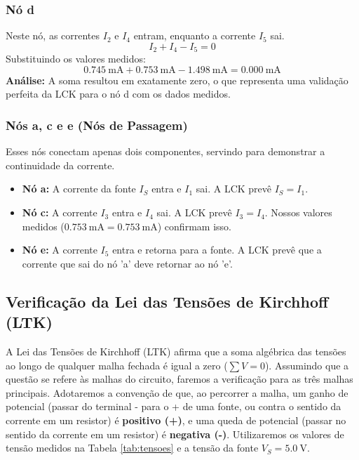 \documentclass[a4paper, 12pt]{article}
\begin{document}
\subsubsection{Nó d}
Neste nó, as correntes $I_2$ e $I_4$ entram, enquanto a corrente $I_5$ sai.
\begin{equation*}
I_2 + I_4 - I_5 = 0
\end{equation*}
Substituindo os valores medidos:
\begin{equation*}
\SI{0.745}{\milli\ampere} + \SI{0.753}{\milli\ampere} - \SI{1.498}{\milli\ampere} = \SI{0.000}{\milli\ampere}
\end{equation*}
\textbf{Análise:} A soma resultou em exatamente zero, o que representa uma validação perfeita da LCK para o nó d com os dados medidos.

\subsubsection{Nós a, c e e (Nós de Passagem)}
Esses nós conectam apenas dois componentes, servindo para demonstrar a continuidade da corrente.
\begin{itemize}
\item \textbf{Nó a:} A corrente da fonte $I_S$ entra e $I_1$ sai. A LCK prevê $I_S = I_1$.
\item \textbf{Nó c:} A corrente $I_3$ entra e $I_4$ sai. A LCK prevê $I_3 = I_4$. Nossos valores medidos ($\SI{0.753}{\milli\ampere} = \SI{0.753}{\milli\ampere}$) confirmam isso.
\item \textbf{Nó e:} A corrente $I_5$ entra e retorna para a fonte. A LCK prevê que a corrente que sai do nó 'a' deve retornar ao nó 'e'.
\end{itemize}

\subsection{Verificação da Lei das Tensões de Kirchhoff (LTK)}

A Lei das Tensões de Kirchhoff (LTK) afirma que a soma algébrica das tensões ao longo de qualquer malha fechada é igual a zero ($\sum V = 0$). Assumindo que a questão se refere às malhas do circuito, faremos a verificação para as três malhas principais. Adotaremos a convenção de que, ao percorrer a malha, um ganho de potencial (passar do terminal - para o + de uma fonte, ou contra o sentido da corrente em um resistor) é \textbf{positivo (+)}, e uma queda de potencial (passar no sentido da corrente em um resistor) é \textbf{negativa (-)}. Utilizaremos os valores de tensão medidos na Tabela \ref{tab:tensoes} e a tensão da fonte $V_S = \SI{5.0}{\volt}$.
\end{document}
